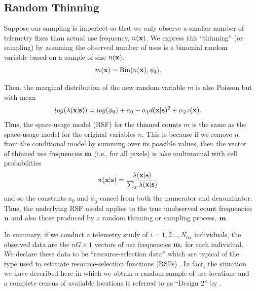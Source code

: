 \documentclass[12pt]{article}
\begin{document}
\subsection{Random Thinning}

Suppose our sampling is imperfect so that we only observe a smaller
number of telemetry fixes than actual use frequency, $n({\bf x})$.
We express this ``thinning'' (or sampling) by assuming the observed number of
uses is a binomial random variable based on a sample of size $n({\bf
  x})$:
\[
 m({\bf x}) \sim \mbox{Bin}(n({\bf x}), \phi_{0}).
\]

 Then, the marginal distribution of the new random variable $m$ is
 also Poisson
but with mean
\[
 log(\lambda({\bf x}|{\bf s})) = log(\phi_{0}) + a_{0} -\alpha_{1}
 d({\bf x}|{\bf s})^{2} +  \alpha_{2} z({\bf x}).
\]
 Thus, the space-usage model (RSF) for the
thinned counts $m$ is the same as the space-usage model for the
original variables $n$.  This is because if we remove $n$
from the conditional
 model by summing over its possible values, then the vector of thinned
 use frequencies
${\bf m}$ (i.e., for all pixels) is {\it also}  multinomial with cell probabilities
\[
\pi({\bf x}|{\bf s}) = \frac{\lambda({\bf x}|{\bf s})}{\sum_{x}  \lambda({\bf x}|{\bf s})}
\]
and so the constants $a_{0}$ and $\phi_{0}$
cancel from both the numerator and
denominator. Thus, the underlying RSF model applies to the true
unobserved count frequencies ${\bf n}$ and also those produced
by a random thinning or sampling process, ${\bf m}$.

In summary, if we conduct a telemetry study of $i=1,2\ldots,N_{tel}$
individuals, the observed data are
the $nG \times 1$  vectors of use frequencies ${\bf m}_{i}$ for each individual.
 We declare these data to be
``resource-selection data'' which are typical of the type used to
estimate resource-selection functions (RSFs) \citep{manly_etal:2002}.
In fact, the situation we have described here in which 
we obtain a random sample
of use locations and a complete census of available locations is
referred to as ``Design 2'' by \citep{manly_etal:2002}. 

\end{document}

